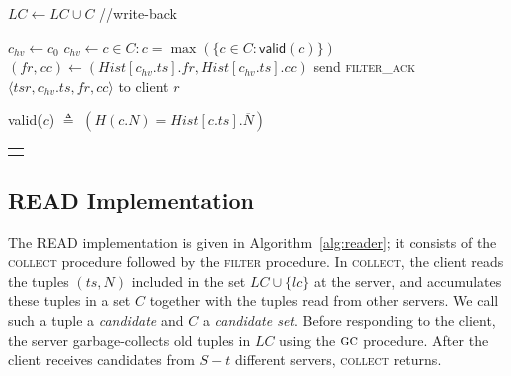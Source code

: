 \documentclass[10pt,conference,compsocconf]{IEEEtran}
\newcommand{\protocol}{PoWerStore}
\newcommand{\nonce}{N}
\newcommand{\hash}{\overline{N}}
\begin{document}
\begin{algo*}[t]
\begin{minipage}[t]{0.5\textwidth}
\begin{distribalgo}[1]
\medskip

\STATE $LC \leftarrow LC \cup C $ \hfill //write-back


\STATE $c_{hv} \leftarrow c_0$
\STATE $c_{hv} \leftarrow c \in C : c $$=$$ \max(\{c \in C: \textsf{valid}(c)\})$ \label{alg:server:valid-check2}
\STATE $(fr,cc) \leftarrow (Hist[c_{hv}.ts].fr, Hist[c_{hv}.ts].cc)$
\STATE send \textsc{filter\_ack}$\langle tsr, c_{hv}.ts, fr, cc \rangle$ to client $r$ \label{alg:server:ret}
\ENDINDENT

\medskip
{}
\STATE \textsf{valid}($c$) $\triangleq$ $(H(c.\nonce) = Hist[c.ts].\hash)$\label{alg:server:valid-pred}
\ENDINDENT

\setcounter{alg:client1:lines}{\value{ALC@line}}
\end{distribalgo}

\end{minipage}

\medskip
\begin{tabular}{c}\hline\mbox{}\hspace{0.97\textwidth}\mbox{}\end{tabular}

\caption{{Algorithm of server $s_i$ in \protocol.}}\label{alg:server}
\end{algo*}



\subsection{\textsc{READ} Implementation}

The \textsc{READ} implementation is given in Algorithm~\ref{alg:reader}; it consists of the \textsc{collect} procedure followed by the \textsc{filter} procedure. In \textsc{collect}, the client reads the tuples $(ts, \nonce)$ included in the set $LC \cup \{lc\}$ at the server, and accumulates these tuples in a set $C$ together with the tuples read from other servers. We call such a tuple a \emph{candidate} and $C$ a \emph{candidate set}. Before responding to the client, the server garbage-collects old tuples in $LC$ using the $\textsc{gc}$ procedure. After the client receives candidates from $S-t$ different servers, \textsc{collect} returns.
\end{document}
